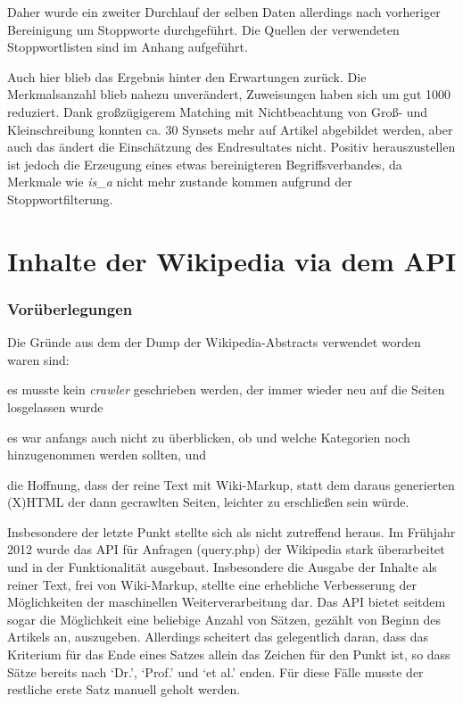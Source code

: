 \documentclass[pagesize,DIV=calc,12pt,draft]{scrreprt}
\begin{document}
Daher wurde ein zweiter Durchlauf der selben Daten allerdings nach
vorheriger Bereinigung um Stoppworte durchgeführt. Die Quellen der
verwendeten Stoppwortlisten sind im Anhang aufgeführt.

Auch hier blieb das Ergebnis hinter den Erwartungen zurück. Die
Merkmalsanzahl blieb nahezu unverändert, Zuweisungen haben sich um gut
1000 reduziert. Dank großzügigerem Matching mit Nichtbeachtung von Groß-
und Kleinschreibung konnten ca. 30 Synsets mehr auf Artikel abgebildet
werden, aber auch das ändert die Einschätzung des Endresultates nicht.
Positiv herauszustellen ist jedoch die Erzeugung eines etwas
bereinigteren Begriffsverbandes, da Merkmale wie \emph{is\_a} nicht mehr
zustande kommen aufgrund der Stoppwortfilterung.

\section{Inhalte der Wikipedia via dem API}

\subsubsection{Vorüberlegungen}

Die Gründe aus dem der Dump der Wikipedia-Abstracts verwendet worden
waren sind: 
\begin{inparaenum}
\item
  es musste kein \emph{crawler} geschrieben werden, der immer wieder neu auf
  die Seiten losgelassen wurde
\item
  es war anfangs auch nicht zu überblicken, ob und welche Kategorien
  noch hinzugenommen werden sollten, und 
\item
  die Hoffnung, dass der reine Text mit Wiki-Markup, statt dem daraus
  generierten (X)HTML der dann gecrawlten Seiten, leichter zu
  erschließen sein würde.
\end{inparaenum}

Insbesondere der letzte Punkt stellte sich als nicht zutreffend heraus.
Im Frühjahr 2012 wurde das API für Anfragen (query.php) der Wikipedia
stark überarbeitet und in der Funktionalität ausgebaut. Insbesondere die
Ausgabe der Inhalte als reiner Text, frei von Wiki-Markup, stellte eine
erhebliche Verbesserung der Möglichkeiten der maschinellen
Weiterverarbeitung dar. Das API bietet seitdem sogar die Möglichkeit
eine beliebige Anzahl von Sätzen, gezählt von Beginn des Artikels an,
auszugeben. Allerdings scheitert das gelegentlich daran, dass das
Kriterium für das Ende eines Satzes allein das Zeichen für den Punkt
ist, so dass Sätze bereits nach `Dr.', `Prof.' und `et al.' enden. Für
diese Fälle musste der restliche erste Satz manuell geholt werden.
\end{document}

